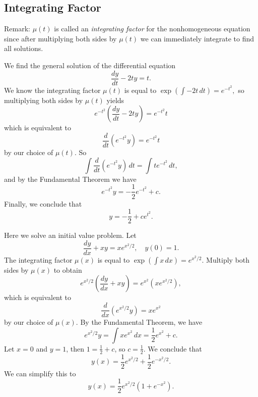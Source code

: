 \subsection{Integrating Factor}
Remark: $\mu(t)$ is called an \emph{integrating factor} for the nonhomogeneous equation since after multiplying both sides by $\mu(t)$ we can immediately integrate to find all solutions.
\begin{example}
    We find the general solution of the differential equation \[
    \frac{dy}{dt}-2ty=t.
    \]
    We know the integrating factor $\mu(t)$ is equal to $\exp\left( \int -2t \, dt \right) = e^{-t^2},$ so multiplying both sides by $\mu(t)$ yields \[
        e^{-t^2}\left( \frac{dy}{dt}-2ty \right) =e^{-t^2}t
    \] which is equivalent to \[
    \frac{d}{dt} \left( e^{-t^2}y \right) = e^{-t^2}t
    \]
    by our choice of $\mu(t)$. So \[
        \int \frac{d}{dt} \left( e^{-t^2}y \right)  \, dt = \int t e^{-t^2} \, dt, 
    \]
    and by the Fundamental Theorem we have \[
    e^{-t^2}y=-\frac{1}{2} e^{-t^2} + c.
    \]
     Finally, we conclude that \[
     y=-\frac{1}{2}+ce^{t^2}.
     \]
\end{example}
\begin{example}
    Here we solve an initial value problem. Let \[
        \frac{dy}{dx}+xy=xe^{x^2/2}, \quad y(0)=1.
    \] The integrating factor $\mu(x)$ is equal to $\exp\left( \int x\, dx \right) = e^{x^2/2}$. Multiply both sides by $\mu(x)$ to obtain \[
    e^{x^2/2}\left( \frac{dy}{dx}+xy \right) =e^{x^2}\left( xe^{x^2/2} \right),
    \] which is equivalent to
    \[
        \frac{d}{dx}\left( e^{x^2/2} y \right) = xe^{x^2}
    \]
    by our choice of $\mu(x)$. By the Fundamental Theorem, we have \[
    e^{x^2/2}y=\int xe^{x^2} \, dx=\frac{1}{2}e^{x^2}+c.
    \]
    Let $x=0$ and $y=1$, then  $1=\frac{1}{2}+c$, so $c=\frac{1}{2}$. We conclude that \[
        y(x)=\frac{1}{2}e^{x^2/2}+\frac{1}{2}e^{-x^2/2}.
\] We can simplify this to \[
y(x) = \frac{1}{2}e^{x^2/2}\left( 1+e^{-x^2} \right) .
\]
\end{example}

